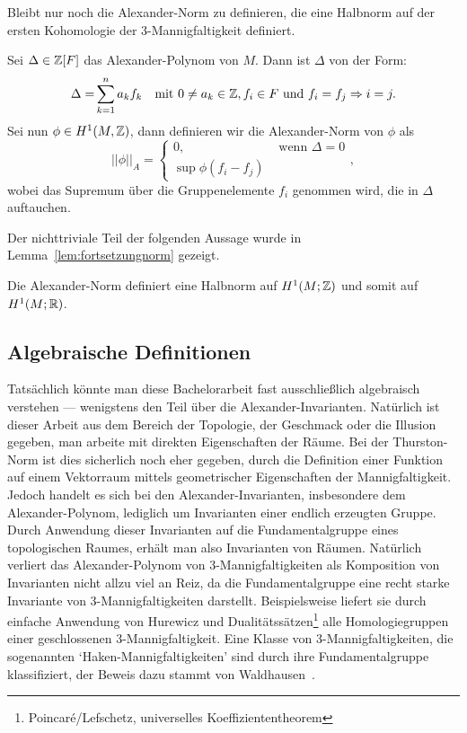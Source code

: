     	Bleibt nur noch die Alexander-Norm zu definieren, die eine Halbnorm auf der ersten Kohomologie der 3-Mannigfaltigkeit definiert.
    	\begin{defn}
    		Sei  $\Delta \in \mathbb{Z} [F]$ das Alexander-Polynom von $M$. Dann ist $\Delta$ von der Form:
    		\begin{align*}
    		    			\Delta = &\sum_{k=1}^n a_k f_k&\text{mit } 0 \neq a_k \in \mathbb{Z}, f_i \in F \text{ und } f_i = f_j \Rightarrow i=j.
    		\end{align*}
    		Sei nun $\phi \in H^1 (M,\mathbb{Z})$, dann definieren wir die Alexander-Norm von $\phi$ als
    		\[
    			||\phi||_A = \begin{cases}
    				0 , &\text{ wenn } \Delta=0\\
    				\sup \phi (f_i - f_j) &
    			\end{cases},
    		\]
    		wobei das Supremum über die Gruppenelemente $f_i$ genommen wird, die in $\Delta$ auftauchen.
    	\end{defn}

    	Der nichttriviale Teil der folgenden Aussage wurde in Lemma~\ref{lem:fortsetzungnorm} gezeigt.
    	\begin{lem}
    		Die Alexander-Norm definiert eine Halbnorm auf $H^1(M;\mathbb{Z})$ und somit auf $H^1(M;\mathbb{R})$.
    	\end{lem}


    \subsection{Algebraische Definitionen}
\label{sec:algebra}

Tatsächlich könnte man diese Bachelorarbeit fast ausschließlich algebraisch verstehen --- wenigstens den Teil über die Alexander-Invarianten. Natürlich ist dieser Arbeit aus dem Bereich der Topologie, der Geschmack oder die Illusion gegeben, man arbeite mit direkten Eigenschaften der Räume. Bei der Thurston-Norm ist dies sicherlich noch eher gegeben, durch die Definition einer Funktion auf einem Vektorraum mittels geometrischer Eigenschaften der Mannigfaltigkeit. Jedoch handelt es sich bei den Alexander-Invarianten, insbesondere dem Alexander-Polynom, lediglich um Invarianten einer endlich erzeugten Gruppe. Durch Anwendung dieser Invarianten auf die Fundamentalgruppe eines topologischen Raumes, erhält man also Invarianten von Räumen. Natürlich verliert das Alexander-Polynom von 3-Mannigfaltigkeiten als Komposition von Invarianten nicht allzu viel an Reiz, da die Fundamentalgruppe eine recht starke Invariante von 3-Mannigfaltigkeiten darstellt. Beispielsweise liefert sie durch einfache Anwendung von Hurewicz und Dualitätssätzen\footnote{Poincaré/Lefschetz, universelles Koeffiziententheorem} alle Homologiegruppen einer geschlossenen 3-Mannigfaltigkeit. Eine Klasse von 3-Mannigfaltigkeiten, die sogenannten `Haken-Mannigfaltigkeiten' sind durch ihre Fundamentalgruppe klassifiziert, der Beweis dazu stammt von Waldhausen~\cite{Waldhausen.1968}. 

